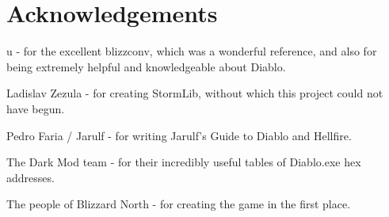 \chapter*{Acknowledgements}

u - for the excellent blizzconv\cite{blizzconv}, which was a wonderful reference, and also for being extremely helpful and knowledgeable about Diablo.

\mbox{}

\noindent
Ladislav Zezula - for creating StormLib\cite{stormlib}, without which this project could not have begun.

\mbox{}

\noindent
Pedro Faria / Jarulf - for writing Jarulf's Guide to Diablo and Hellfire\cite{jarulf}.

\mbox{}

\noindent
The Dark Mod team - for their incredibly useful tables of Diablo.exe hex addresses\cite{dmodhex}.

\mbox{}

\noindent
The people of Blizzard North - for creating the game in the first place.